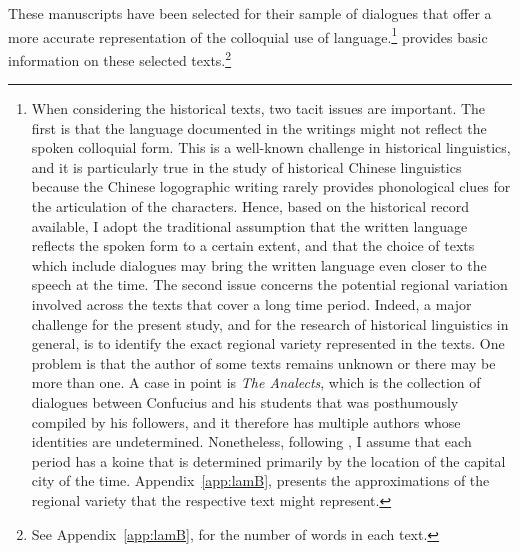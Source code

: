 \documentclass[output=paper,colorlinks,citecolor=brown,chinesefont]{langscibook}
\begin{document}
\newpage
These manuscripts have been selected for their sample of dialogues that offer a more accurate representation of the colloquial use of language.\footnote{When considering the historical texts, two tacit issues are important. The first is that the language documented in the writings might not reflect the spoken colloquial form. This is a well-known challenge in historical linguistics, and it is particularly true in the study of historical Chinese linguistics because the Chinese logographic writing rarely provides phonological clues for the articulation of the characters. Hence, based on the historical record available, I adopt the traditional assumption that the written language reflects the spoken form to a certain extent, and that the choice of texts which include dialogues may bring the written language even closer to the speech at the time. The second issue concerns the potential regional variation involved across the texts that cover a long time period. Indeed, a major challenge for the present study, and for the research of historical linguistics in general, is to identify the exact regional variety represented in the texts. One problem is that the author of some texts remains unknown or there may be more than one. A case in point is \emph{The Analects}, which is the collection of dialogues between Confucius and his students that was posthumously compiled by his followers, and it therefore has multiple authors whose identities are undetermined. Nonetheless, following \cite{TaiChan1999}, I assume that each period has a koine that is determined primarily by the location of the capital city of the time. Appendix~\ref{app:lamB},  presents the approximations of the regional variety that the respective text might represent.}
 provides basic information on these selected texts.\footnote{See Appendix~\ref{app:lamB},  for the number of words in each text.}
\end{document}

